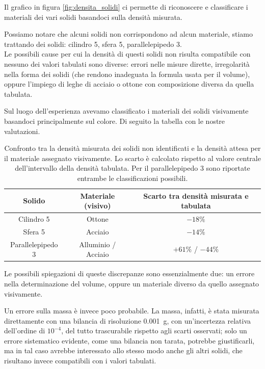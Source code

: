 \documentclass[a4paper]{article}
\begin{document}
Il grafico in figura \ref{fig:densita_solidi} ci permette di riconoscere e classificare i materiali dei vari solidi basandoci sulla densità misurata.

Possiamo notare che alcuni solidi non corrispondono ad alcun materiale, stiamo trattando dei solidi: cilindro 5, sfera 5, parallelepipedo 3. \\ Le possibili cause per cui la densità di questi solidi non risulta compatibile con nessuno dei valori tabulati sono diverse: errori nelle misure dirette, irregolarità nella forma dei solidi (che rendono inadeguata la formula usata per il volume), oppure l'impiego di leghe di acciaio o ottone con composizione diversa da quella tabulata.

Sul luogo dell'esperienza avevamo classificato i materiali dei solidi visivamente basandoci principalmente sul colore. Di seguito la tabella con le nostre valutazioni.

\begin{table}[htbp]
    \centering
    \begin{tabular}{c|c|c}
        Solido & Materiale (visivo) & Scarto tra densità misurata e tabulata \\
        \hline
        Cilindro 5        & Ottone                & $-18\%$ \\
        Sfera 5           & Acciaio               & $-14\%$ \\
        Parallelepipedo 3 & Alluminio / Acciaio   & $+61\%$ / $-44\%$
    \end{tabular}
    \caption{Confronto tra la densità misurata dei solidi non identificati e la densità attesa per il materiale assegnato visivamente. Lo scarto è calcolato rispetto al valore centrale dell'intervallo della densità tabulata. Per il parallelepipedo 3 sono riportate entrambe le classificazioni possibili.}
    \label{tab:scarti_non_identificati}
\end{table}

Le possibili spiegazioni di queste discrepanze sono essenzialmente due: un errore nella determinazione del volume, oppure un materiale diverso da quello assegnato visivamente.

Un errore sulla massa è invece poco probabile. La massa, infatti, è stata misurata direttamente con una bilancia di risoluzione \SI{0.001}{g}, con un'incertezza relativa dell'ordine di $10^{-4}$, del tutto trascurabile rispetto agli scarti osservati; solo un errore sistematico evidente, come una bilancia non tarata, potrebbe giustificarli, ma in tal caso avrebbe interessato allo stesso modo anche gli altri solidi, che risultano invece compatibili con i valori tabulati.
\end{document}
